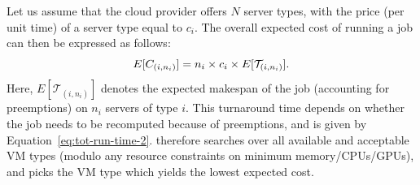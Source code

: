 Let us assume that the cloud provider offers $N$ server types, with the price (per unit time) of a server type equal to $c_i$. 
The overall expected cost of running a job can then be expressed as follows:
\begin{equation}
  \label{eq:e-cost}
\vspace*{\eqnspace}
  E[C_{( i,n_i )}] = n_i\times c_i \times E[\mathcal{T}_{( i,n_i )}].
\end{equation}
Here, $E[\mathcal{T}_{( i,n_i )}]$ denotes the expected makespan of the job (accounting for preemptions) on $n_i$ servers of type $i$. 
%
This turnaround time depends on whether the job needs to be recomputed because of preemptions, and is given by Equation~\ref{eq:tot-run-time-2}. 
%
\sysname therefore searches over all available and acceptable VM types (modulo any resource constraints on minimum memory/CPUs/GPUs), and picks the VM type which yields the lowest expected cost. 










